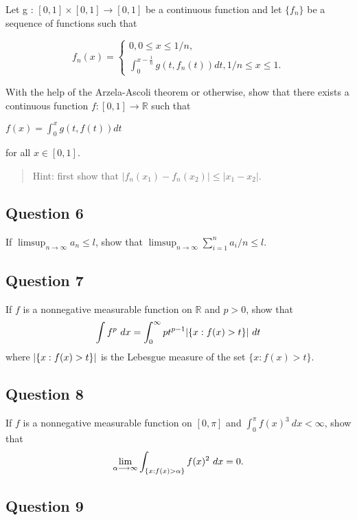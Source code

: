 \documentclass[12pt]{article}
\begin{document}
Let g : \([0, 1] \times [0, 1] \to [0, 1]\) be a continuous function and
let \(\{f_n\}\) be a sequence of functions such that

\[f_n(x)=\begin{cases}{0,   0\leq x\leq 1/n},\\{\int_0^{x-\frac1n} g(t,f_n(t))dt, 1/n\leq x \leq 1.}\end{cases}\]

With the help of the Arzela-Ascoli theorem or otherwise, show that there
exists a continuous function \(f : [0, 1] \to \mathbb{R}\) such that

\(f(x) = \int_0^x g(t, f(t))dt\)

for all \(x \in [0, 1]\).

\begin{quote}
Hint: first show that \(|f_n(x_1) - f_n(x_2)| \leq |x_1 - x_2|\).
\end{quote}

\hypertarget{question-6-1}{%
\subsection{Question 6}\label{question-6-1}}

If \(\limsup_{n\rightarrow \infty} a_n\leq l\), show that
\(\limsup_{n\rightarrow \infty}\sum_{i=1}^n{a_i/n}\leq l\).

\hypertarget{question-7-1}{%
\subsection{Question 7}\label{question-7-1}}

If \(f\) is a nonnegative measurable function on \(\mathbb{R}\) and
\(p > 0\), show that
\[\int f^p ~dx = \int_0^{\infty} p t^{p-1} {\left\lvert {\{x : f(x) > t\}} \right\rvert} ~dt\]
where \({\left\lvert {\{x : f(x) > t\}} \right\rvert}\) is the Lebesgue measure of the set
\(\{x : f(x) > t\}\).

\hypertarget{question-8-1}{%
\subsection{Question 8}\label{question-8-1}}

If \(f\) is a nonnegative measurable function on \([0, \pi]\) and
\(\int_0^\pi f(x)^3~dx < \infty\), show that \begin{align*}
\lim_{\alpha\longrightarrow\infty} \int_{ \left\{{x :f(x) > \alpha}\right\} } f(x)^2 ~dx=0
.\end{align*}

\hypertarget{question-9-1}{%
\subsection{Question 9}\label{question-9-1}}
\end{document}
